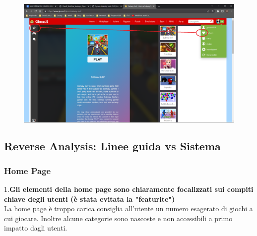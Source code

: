 \documentclass[../Report.tex]{subfiles}
\begin{document}
    \begin{figure}[H]
        \includegraphics[width=\linewidth]{Assestment18.png}
        \centering
    \end{figure}
    \subsection{Reverse Analysis: Linee guida vs Sistema}
    \subsubsection{Home Page}
    1.\textbf{Gli elementi della home page sono chiaramente focalizzati sui compiti chiave degli utenti (è stata evitata la "featurite") }\\
    La home page è troppo carica consiglia all’utente un numero esagerato di giochi a cui giocare. Inoltre alcune categorie sono nascoste e non accessibili a primo impatto dagli utenti. 
\end{document}
